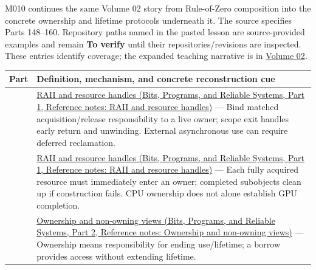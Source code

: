 \hypertarget{appendix-fd090d982a15-m010---parts-148-160}{}

M010 continues the same Volume 02 story from Rule-of-Zero composition into the concrete ownership and lifetime protocols underneath it. The source specifies Parts 148--160. Repository paths named in the pasted lesson are source-provided examples and remain \textbf{To verify} until their repositories/revisions are inspected. These entries identify coverage; the expanded teaching narrative is in \hyperref[01-foundations-i-ch004-from-a-live-object-to-responsible-resource-ownership]{Volume 02}.

{\def\LTcaptype{none} %
\begin{longtable}[]{@{}
  >{\raggedright\arraybackslash}p{}
  >{\raggedright\arraybackslash}p{}@{}}
\toprule\noalign{}
\begin{minipage}[b]{\linewidth}\raggedright
Part
\end{minipage} & \begin{minipage}[b]{\linewidth}\raggedright
Definition, mechanism, and concrete reconstruction cue
\end{minipage} \\
\midrule\noalign{}
\endhead
\bottomrule\noalign{}
\endlastfoot
148 & \href{../01-Bits-Programs-and-Reliable-Systems-P01/main.pdf\#nameddest=appendix-69739d3ab49b}{RAII and resource handles (Bits, Programs, and Reliable Systems, Part 1, Reference notes: RAII and resource handles)} --- Bind matched acquisition/release responsibility to a live owner; scope exit handles early return and unwinding. External asynchronous use can require deferred reclamation. \\
149 & \href{../01-Bits-Programs-and-Reliable-Systems-P01/main.pdf\#nameddest=appendix-69739d3ab49b}{RAII and resource handles (Bits, Programs, and Reliable Systems, Part 1, Reference notes: RAII and resource handles)} --- Each fully acquired resource must immediately enter an owner; completed subobjects clean up if construction fails. CPU ownership does not alone establish GPU completion. \\
150 & \href{../01-Bits-Programs-and-Reliable-Systems-P02/main.pdf\#nameddest=appendix-d52e4486f527}{Ownership and non-owning views (Bits, Programs, and Reliable Systems, Part 2, Reference notes: Ownership and non-owning views)} --- Ownership means responsibility for ending use/lifetime; a borrow provides access without extending lifetime. \\

\end{longtable}}
